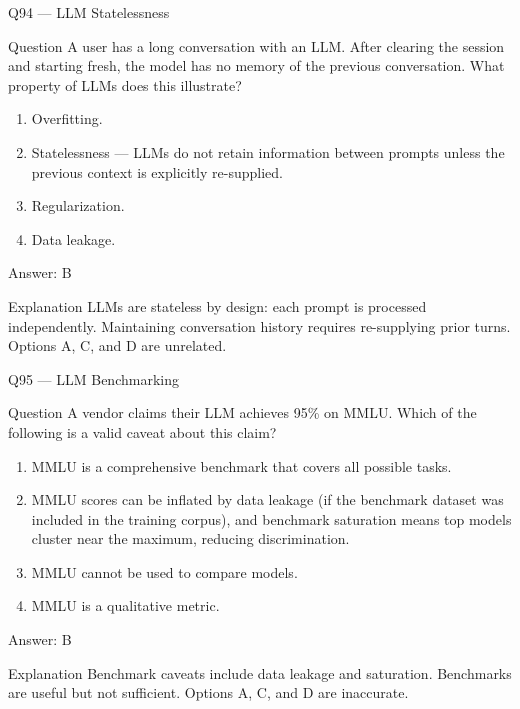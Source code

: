 \documentclass[aspectratio=169,8pt]{beamer}
\begin{document}
\begin{frame}{Q94 --- LLM Statelessness}
\begin{block}{Question}
A user has a long conversation with an LLM. After clearing the session and starting fresh, the model has no memory of the previous conversation. What property of LLMs does this illustrate?
\end{block}
\begin{enumerate}
\item Overfitting.
\item Statelessness --- LLMs do not retain information between prompts unless the previous context is explicitly re-supplied.
\item Regularization.
\item Data leakage.
\end{enumerate}
\begin{exampleblock}{Answer: B}\end{exampleblock}
\begin{block}{Explanation}
LLMs are stateless by design: each prompt is processed independently. Maintaining conversation history requires re-supplying prior turns. Options A, C, and D are unrelated.
\end{block}
\end{frame}

\begin{frame}{Q95 --- LLM Benchmarking}
\begin{block}{Question}
A vendor claims their LLM achieves 95\% on MMLU. Which of the following is a valid caveat about this claim?
\end{block}
\begin{enumerate}
\item MMLU is a comprehensive benchmark that covers all possible tasks.
\item MMLU scores can be inflated by data leakage (if the benchmark dataset was included in the training corpus), and benchmark saturation means top models cluster near the maximum, reducing discrimination.
\item MMLU cannot be used to compare models.
\item MMLU is a qualitative metric.
\end{enumerate}
\begin{exampleblock}{Answer: B}\end{exampleblock}
\begin{block}{Explanation}
Benchmark caveats include data leakage and saturation. Benchmarks are useful but not sufficient. Options A, C, and D are inaccurate.
\end{block}
\end{frame}
\end{document}
